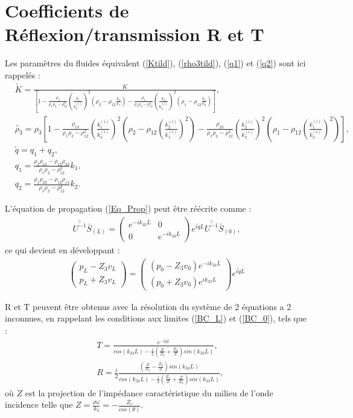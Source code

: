 \documentclass[12pt]{report}
\begin{document}
\section{Coefficients de Réflexion/transmission R et T}
\label{Ch_Dir_S_R/T}
    Les paramètres du fluides équivalent (\ref{Ktild}), (\ref{rho3tild}), (\ref{q1}) et (\ref{q2}) sont ici rappelés :
    \begin{align*}
    &\tilde{K}=\frac{K}{[1-\frac{\rho_3}{\rho_1\rho_2-\rho_{12}^2}(\frac{k_1}{k_3^{(i)}})^2(\rho_2-\rho_{12}\frac{k_2}{k_1})-\frac{\rho_3}{\rho_1\rho_2-\rho_{12}^2}(\frac{k_2}{k_3^{(i)}})^2(\rho_1-\rho_{12}\frac{k_1}{k_2})]},\\
    &\tilde{\rho_3}=\rho_3[1-\frac{\rho_{13}}{\rho_1\rho_2-\rho_{12}^2}(\frac{k_1^{(i)}}{k_3^{(i)}})^2(\rho_2-\rho_{12}(\frac{k_2^{(i)}}{k_1^{(i)}})^2)-\frac{\rho_{23}}{\rho_{1}\rho_2-\rho_{12}^2}(\frac{k_2^{(i)}}{k_3^{(i)}})^2(\rho_1-\rho_{12}(\frac{k_1^{(i)}}{k_2^{(i)}})^2)], \\
    &\tilde{q}=q_1+q_2,\\
    &q_{1}=\frac{\rho_2\rho_{13}-\rho_{12}\rho_{23}}{\rho_1\rho_2-\rho_{12}^2}k_1,\\
    &q_{2}= \frac{\rho_1\rho_{23}-\rho_{12}\rho_{13}}{\rho_1\rho_2-\rho_{12}^2}k_2.
    \end{align*}
    
    L'équation de propagation (\ref{Eq_Prop}) peut être réécrite comme :
    \begin{align}
         \bar{\bar{U^{-1}}}\bar{S}_{(L)}=\begin{pmatrix}
                        e^{-ik_{33}L} & 0 \\ 0 & e^{-ik_{33}L} 
                      \end{pmatrix} e^{i\tilde{q}L}\bar{\bar{U^{-1}}}\bar{S}_{(0)},
    \end{align}
    ce qui devient en développant :
    \begin{align}
    \begin{pmatrix}
		p_L-Z_3v_L \\ p_L+Z_3v_L
    \end{pmatrix}=\begin{pmatrix}
              		(p_0-Z_3v_0)e^{-i k_{33} L} \\ (p_0+Z_3v_0)e^{i k_{33} L}
            \end{pmatrix} e^{i \tilde{q} L}\label{eqDif_tmp}
    \end{align}  
    
    R et T peuvent être obtenus avec la résolution du système de 2 équations a 2 inconnues, en rappelant les conditions aux limites (\ref{BC_L}) et (\ref{BC_0}), tels que :
    \begin{align}
    &T=\frac{e^{-i\tilde{q}L}}{cos(k_{33}L)-\frac{i}{2}(\frac{Z}{Z_3}+\frac{Z_3}{Z})sin(k_{33}L)}\label{Transmission},\\ 
    &R=\frac{i}{2} \frac{(\frac{Z}{Z_3}-\frac{Z_3}{Z})sin(k_{33}L)}{cos(k_{33}L)-\frac{i}{2}(\frac{Z_3}{Z}+\frac{Z}{Z_3})sin(k_{33}L)}\label{Reflexion},
    \end{align}
    où $Z$ est la projection de l'impédance caractéristique du milieu de l'onde incidence telle que $Z=\frac{\rho\omega}{k_3}=-\frac{Z_c}{cos(\theta)}$.
    
\end{document}
